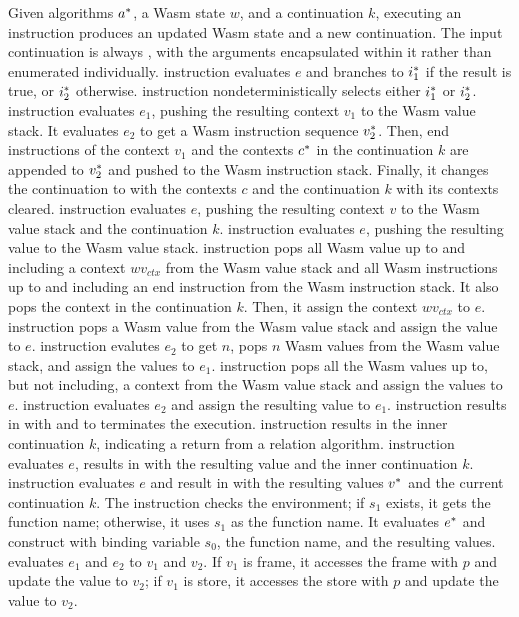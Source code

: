 Given algorithms $a^*$, a Wasm state $w$, and a continuation $k$, executing an
instruction produces an updated Wasm state and a new continuation.
The input continuation is always \algo{}, with the arguments encapsulated
within it rather than enumerated individually.
\ifi{} instruction evaluates $e$ and branches to $i^*_1$ if the result is
true, or $i^*_2$ otherwise.
\eitheri{} instruction nondeterministically selects either $i^*_1$ or $i^*_2$.
\enteri{} instruction evaluates $e_1$, pushing the resulting context $v_1$ to
the Wasm value stack.
It evaluates $e_2$ to get a Wasm instruction sequence $v_2^*$.
Then, end instructions of the context $v_1$ and the contexts $c^*$ in the
continuation $k$ are appended to $v^*_2$ and pushed to the Wasm instruction
stack.
Finally, it changes the continuation to \wasm{} with the contexts $c$ and
the continuation $k$ with its contexts cleared.
\pushctxi{} instruction evaluates $e$, pushing the resulting context $v$ to the
Wasm value stack and the continuation $k$.
\pushi{} instruction evaluates $e$, pushing the resulting value to the Wasm
value stack.
\popctxi{} instruction pops all Wasm value up to and including a context
$wv_{ctx}$ from the Wasm value stack and all Wasm instructions up to and
including an end instruction from the Wasm instruction stack.
It also pops the context in the continuation $k$.
Then, it assign the context $wv_{ctx}$ to $e$.
\popi{} instruction pops a Wasm value from the Wasm value stack and assign the
value to $e$.
\popni{} instruction evalutes $e_2$ to get $n$, pops $n$ Wasm values from the
Wasm value stack, and assign the values to $e_1$.
\popalli{} instruction pops all the Wasm values up to, but not including, a
context from the Wasm value stack and assign the values to $e$.
 instruction evaluates $e_2$ and assign the resulting value to $e_1$.
\trapi{} instruction results in \ret{} with \trapv{} and \mt{} to terminates
the execution.
\returnreli{} instruction results in the inner continuation $k$, indicating a
return from a relation algorithm.
\returnfunci{} instruction evaluates $e$, results in \ret{} with the resulting
value and the inner continuation $k$.
\executei{} instruction evaluates $e$ and result in \exe{} with the resulting
values $v^*$ and the current continuation $k$.
The \calli{} instruction checks the environment; if $s_1$ exists, it gets the
function name; otherwise, it uses $s_1$ as the function name.
It evaluates $e^*$ and construct \call{} with binding variable $s_0$, the
function name, and the resulting values.
\replacei{} evaluates $e_1$ and $e_2$ to $v_1$ and $v_2$.
If $v_1$ is frame, it accesses the frame with $p$ and update the value to
$v_2$; if $v_1$ is store, it accesses the store with $p$ and update the value
to $v_2$.




